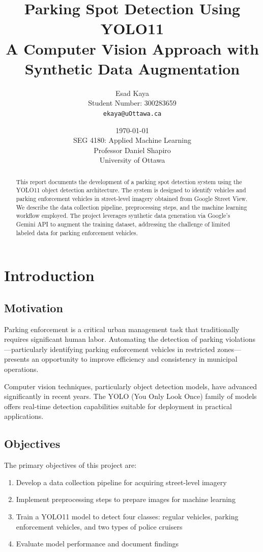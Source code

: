 \documentclass[12pt,a4paper]{article}
\title{
    \textbf{Parking Spot Detection Using YOLO11}\\
    \large A Computer Vision Approach with Synthetic Data Augmentation
}
\author{
    Esad Kaya\\
    Student Number: 300283659\\
    \texttt{ekaya@uOttawa.ca}
}
\date{
    \today\\[1em]
    \normalsize SEG 4180: Applied Machine Learning\\
    Professor Daniel Shapiro\\
    University of Ottawa
}
\begin{document}
\maketitle

\begin{abstract}
	This report documents the development of a parking spot detection system using the YOLO11 object detection architecture. The system is designed to identify vehicles and parking enforcement vehicles in street-level imagery obtained from Google Street View. We describe the data collection pipeline, preprocessing steps, and the machine learning workflow employed. The project leverages synthetic data generation via Google's Gemini API to augment the training dataset, addressing the challenge of limited labeled data for parking enforcement vehicles.
\end{abstract}

\tableofcontents
\newpage

\section{Introduction}

\subsection{Motivation}

Parking enforcement is a critical urban management task that traditionally requires significant human labor. Automating the detection of parking violations---particularly identifying parking enforcement vehicles in restricted zones---presents an opportunity to improve efficiency and consistency in municipal operations.

Computer vision techniques, particularly object detection models, have advanced significantly in recent years. The YOLO (You Only Look Once) family of models offers real-time detection capabilities suitable for deployment in practical applications.

\subsection{Objectives}

The primary objectives of this project are:

\begin{enumerate}
	\item Develop a data collection pipeline for acquiring street-level imagery
	\item Implement preprocessing steps to prepare images for machine learning
	\item Train a YOLO11 model to detect four classes: regular vehicles, parking enforcement vehicles, and two types of police cruisers
	\item Evaluate model performance and document findings
\end{enumerate}
\end{document}
